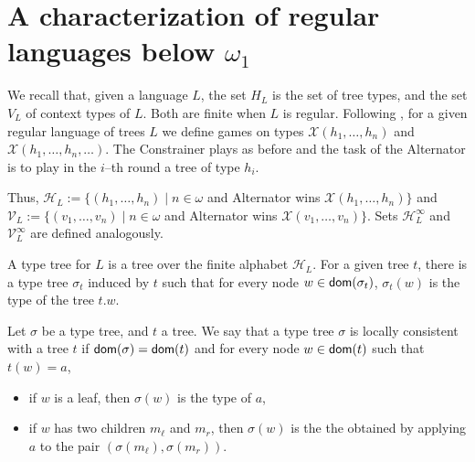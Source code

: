 \section{A characterization of regular languages  below $\omega_1$}

We recall that, given a language $L$, the set $H_L$ is the set of tree types, and the set $V_L$ of context types of $L$. Both are finite when $L$ is regular. Following \cite{bp}, for a given regular language of trees $L$ we define games on types $\mathcal{X}(h_1, \dots, h_n)$ and $\mathcal{X}(h_1, \dots, h_n, \dots)$. The Constrainer plays as before and the task of the Alternator is to play in the $i$--th round a tree of type $h_i$. 



Thus, 
$\mathcal{H}_L:= \{(h_1, \dots, h_n) 
\mid 
n \in \omega 
$
and Alternator wins $\mathcal{X}(h_1, \dots, h_n)\}$
and 
$\mathcal{V}_L:= \{(v_1, \dots, v_n) \mid n \in \omega 
$
and Alternator wins $\mathcal{X}(v_1, \dots, v_n)\}$.
Sets 
$\mathcal{H}^\infty_L$ and $\mathcal{V}^\infty_L$ are defined analogously.




A type tree for $L$ is a tree over the finite alphabet $\mathcal{H}_L$. For a given tree $t$, there is a type tree $\sigma_t$ induced by $t$ such that for every node $w \in \mathsf{dom}(\sigma_t)$, $\sigma_t(w)$ is the type of the tree $t.w$.

Let $\sigma$ be a type tree, and $t$ a tree. We say that a type tree $\sigma$ is locally consistent with a tree $t$ if $\mathsf{dom}(\sigma)=\mathsf{dom}(t)$ and for every node $w \in \mathsf{dom}(t)$ such that $t(w)=a$, 
\begin{itemize}
\item if $w$ is a leaf, then $\sigma(w)$ is the type of $a$,
\item if $w$ has two children $m_\ell$ and $m_r$, then $\sigma(w)$ is the the obtained by applying $a$ to the pair $(\sigma(m_\ell), \sigma(m_r))$.
\end{itemize}

